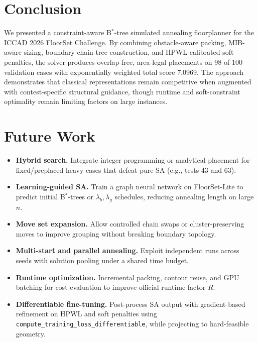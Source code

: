 \documentclass[11pt]{article}
\begin{document}
\section{Conclusion}

We presented a constraint-aware B$^*$-tree simulated annealing floorplanner for the ICCAD 2026 FloorSet Challenge. By combining obstacle-aware packing, MIB-aware sizing, boundary-chain tree construction, and HPWL-calibrated soft penalties, the solver produces overlap-free, area-legal placements on 98 of 100 validation cases with exponentially weighted total score 7.0969. The approach demonstrates that classical representations remain competitive when augmented with contest-specific structural guidance, though runtime and soft-constraint optimality remain limiting factors on large instances.

\section{Future Work}

\begin{itemize}
    \item \textbf{Hybrid search.} Integrate integer programming or analytical placement for fixed/preplaced-heavy cases that defeat pure SA (e.g., tests 43 and 63).
    \item \textbf{Learning-guided SA.} Train a graph neural network on FloorSet-Lite to predict initial B$^*$-trees or $\lambda_b,\lambda_g$ schedules, reducing annealing length on large $n$.
    \item \textbf{Move set expansion.} Allow controlled chain swaps or cluster-preserving moves to improve grouping without breaking boundary topology.
    \item \textbf{Multi-start and parallel annealing.} Exploit independent runs across seeds with solution pooling under a shared time budget.
    \item \textbf{Runtime optimization.} Incremental packing, contour reuse, and GPU batching for cost evaluation to improve official runtime factor $R$.
    \item \textbf{Differentiable fine-tuning.} Post-process SA output with gradient-based refinement on HPWL and soft penalties using \texttt{compute\_training\_loss\_differentiable}, while projecting to hard-feasible geometry.
\end{itemize}
\end{document}
